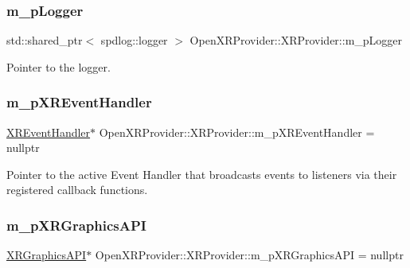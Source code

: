 \subsubsection{\texorpdfstring{m\_pLogger}{m\_pLogger}}
{\footnotesize\ttfamily std\+::shared\+\_\+ptr$<$ spdlog\+::logger $>$ Open\+X\+R\+Provider\+::\+X\+R\+Provider\+::m\+\_\+p\+Logger\hspace{0.3cm}{\ttfamily [private]}}



Pointer to the logger. 

\mbox{\label{class_open_x_r_provider_1_1_x_r_provider_a567e5a128da44ded57c3a666704a9c17}} 
\subsubsection{\texorpdfstring{m\_pXREventHandler}{m\_pXREventHandler}}
{\footnotesize\ttfamily \mbox{\hyperlink{class_open_x_r_provider_1_1_x_r_event_handler}{X\+R\+Event\+Handler}}$\ast$ Open\+X\+R\+Provider\+::\+X\+R\+Provider\+::m\+\_\+p\+X\+R\+Event\+Handler = nullptr\hspace{0.3cm}{\ttfamily [private]}}



Pointer to the active Event Handler that broadcasts events to listeners via their registered callback functions. 

\mbox{\label{class_open_x_r_provider_1_1_x_r_provider_a981c5add10cfe23149e821b470145957}} 
\subsubsection{\texorpdfstring{m\_pXRGraphicsAPI}{m\_pXRGraphicsAPI}}
{\footnotesize\ttfamily \mbox{\hyperlink{class_open_x_r_provider_1_1_x_r_graphics_a_p_i}{X\+R\+Graphics\+A\+PI}}$\ast$ Open\+X\+R\+Provider\+::\+X\+R\+Provider\+::m\+\_\+p\+X\+R\+Graphics\+A\+PI = nullptr\hspace{0.3cm}{\ttfamily [private]}}



